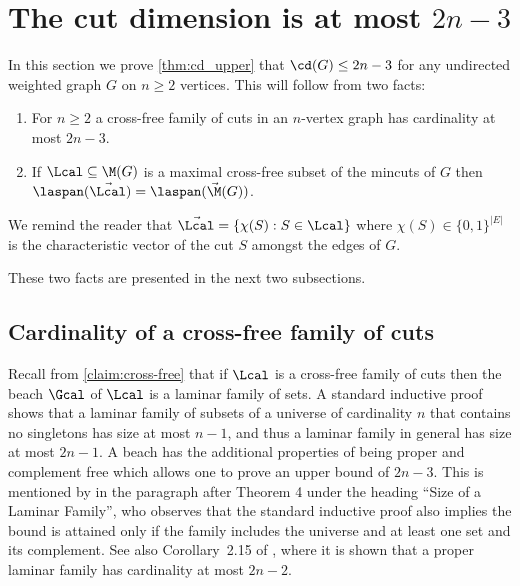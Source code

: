 
















































\setcounter{section}{3}\setcounter{theorem}{15}\section{The cut dimension is at most $2n-3$}\label{sec:upper}
In this section we prove \cref{thm:cd_upper} that $\cd(G) \le 2n-3$ for any undirected weighted graph $G$ on $n \ge 2$ vertices.  This will follow from
two facts:
\begin{enumerate}
  \item For $n \ge 2$ a cross-free family of cuts in an $n$-vertex graph has cardinality at most $2n-3$.
  \item If $\Lcal \subseteq \M(G)$ is a maximal cross-free subset of the mincuts of $G$
  then $\laspan(\vec{\Lcal}) = \laspan(\vec{\M}(G))$.
\end{enumerate}
We remind the reader that $\vec{\Lcal} = \{\chi(S) : S \in \Lcal\}$ where $\chi(S) \in \{0,1\}^{|E|}$ is the characteristic
vector of the cut $S$ amongst the edges of $G$.

These two facts are presented in the next two subsections.

\subsection{Cardinality of a cross-free family of cuts}
\label{sec:card}
Recall from \cref{claim:cross-free} that if $\Lcal$ is a cross-free family of cuts then the beach $\Gcal$ of $\Lcal$ is a laminar family of sets.
A standard inductive proof shows that a laminar family of subsets of a universe of cardinality $n$ that contains no singletons has size at most $n-1$, and thus a laminar
family in general has size at most $2n-1$.  A beach has the additional properties of being proper and complement free
which allows one to prove an upper bound of $2n-3$.  This is mentioned by \cite{Goemans06} in the paragraph after Theorem 4
under the heading ``Size of a Laminar Family'', who observes that the standard inductive proof also
implies the bound is attained only if the family includes the universe and at least one set and its complement.
See also Corollary~2.15 of \cite{KV18}, where it is shown that a proper laminar family has cardinality at most $2n-2$.


